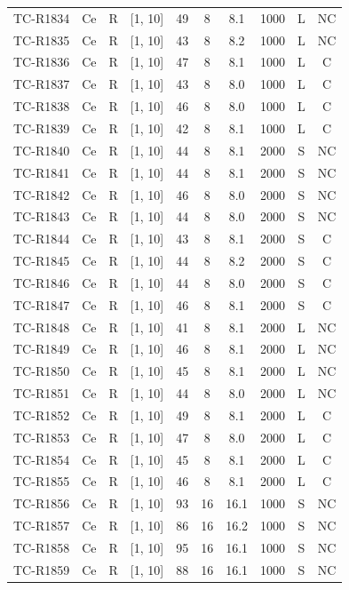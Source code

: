 \begin{longtable}{lccccccccc}
TC-R1834 & Ce & R & [1, 10] & 49 & 8 & 8.1 & 1000 & L & NC \\
TC-R1835 & Ce & R & [1, 10] & 43 & 8 & 8.2 & 1000 & L & NC \\
TC-R1836 & Ce & R & [1, 10] & 47 & 8 & 8.1 & 1000 & L & C \\
TC-R1837 & Ce & R & [1, 10] & 43 & 8 & 8.0 & 1000 & L & C \\
TC-R1838 & Ce & R & [1, 10] & 46 & 8 & 8.0 & 1000 & L & C \\
TC-R1839 & Ce & R & [1, 10] & 42 & 8 & 8.1 & 1000 & L & C \\
TC-R1840 & Ce & R & [1, 10] & 44 & 8 & 8.1 & 2000 & S & NC \\
TC-R1841 & Ce & R & [1, 10] & 44 & 8 & 8.1 & 2000 & S & NC \\
TC-R1842 & Ce & R & [1, 10] & 46 & 8 & 8.0 & 2000 & S & NC \\
TC-R1843 & Ce & R & [1, 10] & 44 & 8 & 8.0 & 2000 & S & NC \\
TC-R1844 & Ce & R & [1, 10] & 43 & 8 & 8.1 & 2000 & S & C \\
TC-R1845 & Ce & R & [1, 10] & 44 & 8 & 8.2 & 2000 & S & C \\
TC-R1846 & Ce & R & [1, 10] & 44 & 8 & 8.0 & 2000 & S & C \\
TC-R1847 & Ce & R & [1, 10] & 46 & 8 & 8.1 & 2000 & S & C \\
TC-R1848 & Ce & R & [1, 10] & 41 & 8 & 8.1 & 2000 & L & NC \\
TC-R1849 & Ce & R & [1, 10] & 46 & 8 & 8.1 & 2000 & L & NC \\
TC-R1850 & Ce & R & [1, 10] & 45 & 8 & 8.1 & 2000 & L & NC \\
TC-R1851 & Ce & R & [1, 10] & 44 & 8 & 8.0 & 2000 & L & NC \\
TC-R1852 & Ce & R & [1, 10] & 49 & 8 & 8.1 & 2000 & L & C \\
TC-R1853 & Ce & R & [1, 10] & 47 & 8 & 8.0 & 2000 & L & C \\
TC-R1854 & Ce & R & [1, 10] & 45 & 8 & 8.1 & 2000 & L & C \\
TC-R1855 & Ce & R & [1, 10] & 46 & 8 & 8.1 & 2000 & L & C \\
TC-R1856 & Ce & R & [1, 10] & 93 & 16 & 16.1 & 1000 & S & NC \\
TC-R1857 & Ce & R & [1, 10] & 86 & 16 & 16.2 & 1000 & S & NC \\
TC-R1858 & Ce & R & [1, 10] & 95 & 16 & 16.1 & 1000 & S & NC \\
TC-R1859 & Ce & R & [1, 10] & 88 & 16 & 16.1 & 1000 & S & NC \\

\end{longtable}
